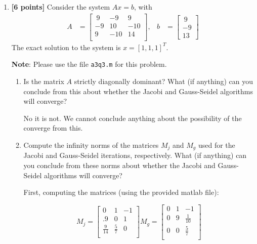 \documentclass{article}
\begin{document}
\begin{enumerate}
\begin{mdframed}[style=MyFrame]
\end{mdframed}

\item {\bf[6 points]} Consider the system $Ax = b$, with
\begin{align*}
A &= \begin{bmatrix}
 ~9     &-9     &9 \\
  -9     &10     &-10 \\
   9     &-10     &14 \\
\end{bmatrix},
&b &= \begin{bmatrix}~9 \\-9\\13 \end{bmatrix}
\end{align*}
The exact solution to the system is $x = [1, 1, 1]^T$.

{\bf Note}: Please use the file {\tt a3q3.m} for this problem.

\begin{enumerate}
\item Is the matrix $A$ strictly diagonally dominant? What (if anything) can you conclude from this about whether the Jacobi and Gauss-Seidel algorithms will converge? \newline

\begin{mdframed}[style=MyFrame]
No it is not. We cannot conclude anything about the possibility of the converge from this.
\end{mdframed}

\item Compute the infinity norms of the matrices $M_j$ and $M_g$ used for the Jacobi and Gauss-Seidel iterations, respectively. What (if anything) can you conclude from these norms about whether the Jacobi and Gauss-Seidel algorithms will converge?

\begin{mdframed}[style=MyFrame]
First, computing the matrices (using the provided matlab file):

\begin{equation*}
  M_{j} = \begin{bmatrix}
     0     &1     &-1 \\
     .9     &0     &1 \\
     \frac{9}{14}     &\frac{5}{7}     &0 \\
  \end{bmatrix}
M_{g} = \begin{bmatrix}
 0     &1     &-1 \\
 0     &9     &\frac{1}{10} \\
0       &0     &\frac{5}{7} \\
\end{bmatrix}
\end{equation*}


\end{mdframed}
\end{enumerate}
\end{enumerate}
\end{document}
